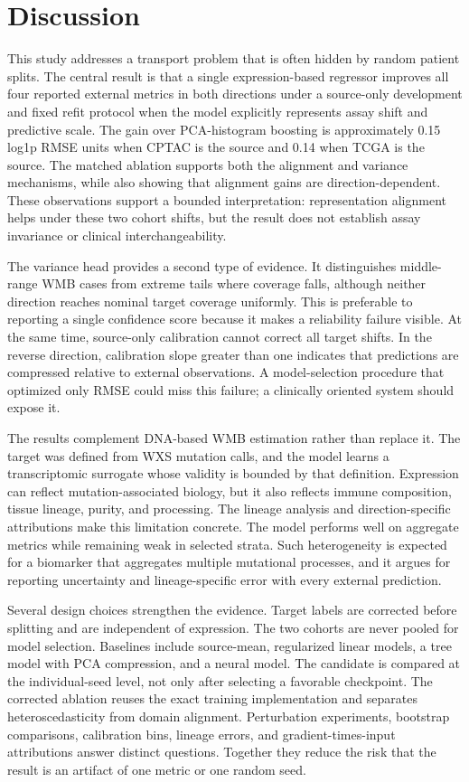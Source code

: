 \documentclass[11pt]{article}
\begin{document}
\section{Discussion}
This study addresses a transport problem that is often hidden by random patient splits. The central result is that a single expression-based regressor improves all four reported external metrics in both directions under a source-only development and fixed refit protocol when the model explicitly represents assay shift and predictive scale. The gain over PCA-histogram boosting is approximately 0.15 log1p RMSE units when CPTAC is the source and 0.14 when TCGA is the source. The matched ablation supports both the alignment and variance mechanisms, while also showing that alignment gains are direction-dependent. These observations support a bounded interpretation: representation alignment helps under these two cohort shifts, but the result does not establish assay invariance or clinical interchangeability.

The variance head provides a second type of evidence. It distinguishes middle-range WMB cases from extreme tails where coverage falls, although neither direction reaches nominal target coverage uniformly. This is preferable to reporting a single confidence score because it makes a reliability failure visible. At the same time, source-only calibration cannot correct all target shifts. In the reverse direction, calibration slope greater than one indicates that predictions are compressed relative to external observations. A model-selection procedure that optimized only RMSE could miss this failure; a clinically oriented system should expose it.

The results complement DNA-based WMB estimation rather than replace it. The target was defined from WXS mutation calls, and the model learns a transcriptomic surrogate whose validity is bounded by that definition. Expression can reflect mutation-associated biology, but it also reflects immune composition, tissue lineage, purity, and processing. The lineage analysis and direction-specific attributions make this limitation concrete. The model performs well on aggregate metrics while remaining weak in selected strata. Such heterogeneity is expected for a biomarker that aggregates multiple mutational processes, and it argues for reporting uncertainty and lineage-specific error with every external prediction.

Several design choices strengthen the evidence. Target labels are corrected before splitting and are independent of expression. The two cohorts are never pooled for model selection. Baselines include source-mean, regularized linear models, a tree model with PCA compression, and a neural model. The candidate is compared at the individual-seed level, not only after selecting a favorable checkpoint. The corrected ablation reuses the exact training implementation and separates heteroscedasticity from domain alignment. Perturbation experiments, bootstrap comparisons, calibration bins, lineage errors, and gradient-times-input attributions answer distinct questions. Together they reduce the risk that the result is an artifact of one metric or one random seed.
\end{document}
